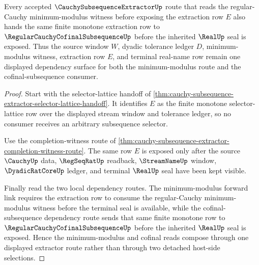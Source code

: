\begin{theorem}
\label{thm:cauchy-subsequence-extractor-min-modulus-cofinal-route}
Every accepted $\CauchySubsequenceExtractorUp$ route that reads the regular-Cauchy minimum-modulus witness before exposing the extraction row $E$ also hands the same finite monotone extraction row to $\RegularCauchyCofinalSubsequenceUp$ before the inherited $\RealUp$ seal is exposed. Thus the source window $W$, dyadic tolerance ledger $D$, minimum-modulus witness, extraction row $E$, and terminal real-name row remain one displayed dependency surface for both the minimum-modulus route and the cofinal-subsequence consumer.
\end{theorem}
\begin{proof}
Start with the selector-lattice handoff of \autoref{thm:cauchy-subsequence-extractor-selector-lattice-handoff}. It identifies $E$ as the finite monotone selector-lattice row over the displayed stream window and tolerance ledger, so no consumer receives an arbitrary subsequence selector.

Use the completion-witness route of \autoref{thm:cauchy-subsequence-extractor-completion-witness-route}. The same row $E$ is exposed only after the source $\CauchyUp$ data, $\RegSeqRatUp$ readback, $\StreamNameUp$ window, $\DyadicRatCoreUp$ ledger, and terminal $\RealUp$ seal have been kept visible.

Finally read the two local dependency routes. The minimum-modulus forward link requires the extraction row to consume the regular-Cauchy minimum-modulus witness before the terminal seal is available, while the cofinal-subsequence dependency route sends that same finite monotone row to $\RegularCauchyCofinalSubsequenceUp$ before the inherited $\RealUp$ seal is exposed. Hence the minimum-modulus and cofinal reads compose through one displayed extractor route rather than through two detached host-side selections.
\end{proof}
